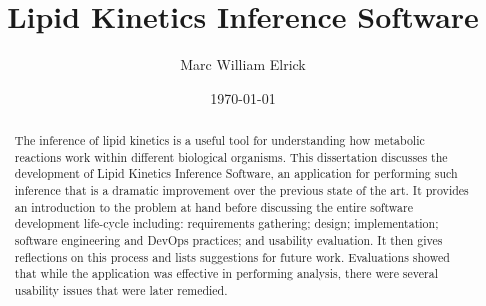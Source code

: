 \documentclass{l4proj}
\begin{document}
\title{Lipid Kinetics Inference Software}
\author{Marc William Elrick}
\date{\today}
\maketitle

\begin{abstract}

    
    The inference of lipid kinetics is a useful tool for understanding how metabolic reactions work within different biological organisms. This dissertation discusses the development of Lipid Kinetics Inference Software, an application for performing such inference that is a dramatic improvement over the previous state of the art. It provides an introduction to the problem at hand before discussing the entire software development life-cycle including: requirements gathering; design; implementation; software engineering and DevOps practices; and usability evaluation. It then gives reflections on this process and lists suggestions for future work. Evaluations showed that while the application was effective in performing analysis, there were several usability issues that were later remedied.
\end{abstract}


%
%
\def\consentname {Marc Elrick} %
\def\consentdate {\today} %
%
\educationalconsent


\tableofcontents
\end{document}
